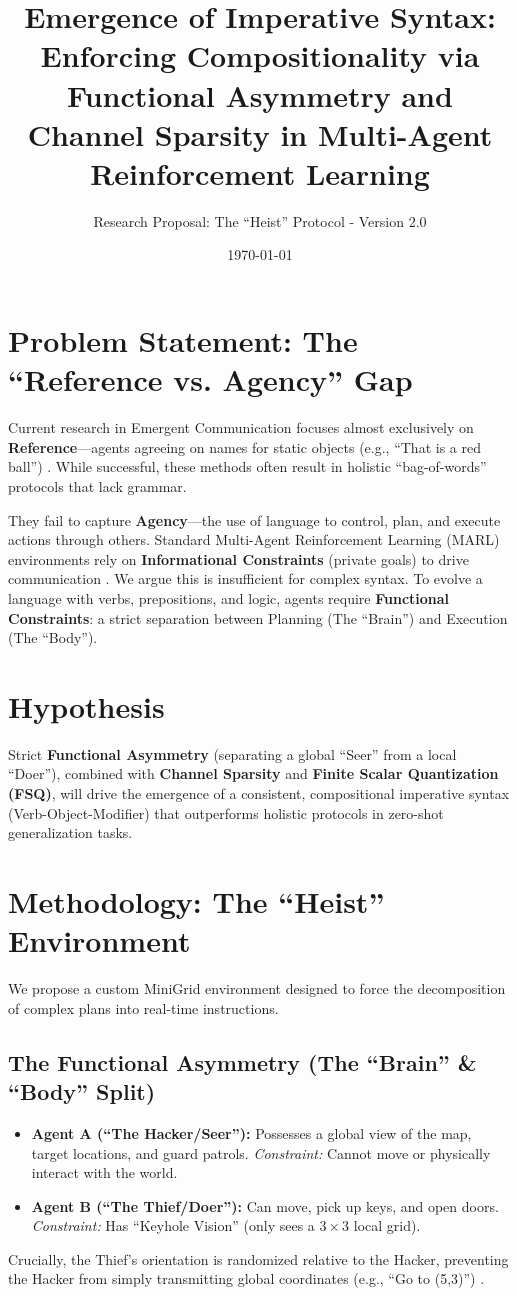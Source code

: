\documentclass[11pt]{article}
\title{Emergence of Imperative Syntax: Enforcing Compositionality via Functional Asymmetry and Channel Sparsity in Multi-Agent Reinforcement Learning}
\author{Research Proposal: The ``Heist'' Protocol - Version 2.0}
\date{\today}
\begin{document}
\maketitle

\section{Problem Statement: The ``Reference vs. Agency'' Gap}
Current research in Emergent Communication focuses almost exclusively on \textbf{Reference}—agents agreeing on names for static objects (e.g., ``That is a red ball'') \cite{1}. While successful, these methods often result in holistic ``bag-of-words'' protocols that lack grammar. 

They fail to capture \textbf{Agency}—the use of language to control, plan, and execute actions through others. Standard Multi-Agent Reinforcement Learning (MARL) environments rely on \textbf{Informational Constraints} (private goals) to drive communication \cite{2}. We argue this is insufficient for complex syntax. To evolve a language with verbs, prepositions, and logic, agents require \textbf{Functional Constraints}: a strict separation between Planning (The ``Brain'') and Execution (The ``Body'').

\section{Hypothesis}
Strict \textbf{Functional Asymmetry} (separating a global ``Seer'' from a local ``Doer''), combined with \textbf{Channel Sparsity} and \textbf{Finite Scalar Quantization (FSQ)}, will drive the emergence of a consistent, compositional imperative syntax (Verb-Object-Modifier) that outperforms holistic protocols in zero-shot generalization tasks.

\section{Methodology: The ``Heist'' Environment}
We propose a custom MiniGrid environment designed to force the decomposition of complex plans into real-time instructions.

\subsection{The Functional Asymmetry (The ``Brain'' \& ``Body'' Split)}
\begin{itemize}
    \item \textbf{Agent A (``The Hacker/Seer''):} Possesses a global view of the map, target locations, and guard patrols. \textit{Constraint:} Cannot move or physically interact with the world.
    \item \textbf{Agent B (``The Thief/Doer''):} Can move, pick up keys, and open doors. \textit{Constraint:} Has ``Keyhole Vision'' (only sees a $3 \times 3$ local grid). 
\end{itemize}
Crucially, the Thief's orientation is randomized relative to the Hacker, preventing the Hacker from simply transmitting global coordinates (e.g., ``Go to (5,3)'') \cite{3}. 
\end{document}
